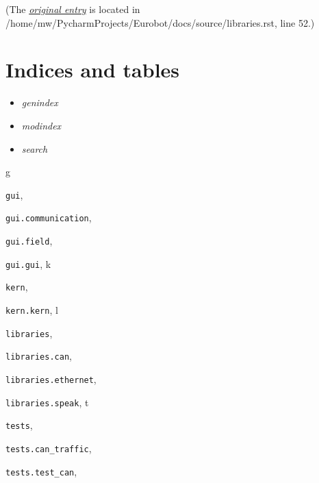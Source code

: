 \documentclass[letterpaper,10pt,english]{sphinxmanual}
\begin{document}
(The {\hyperref[libraries:index-0]{\emph{original entry}}} is located in  /home/mw/PycharmProjects/Eurobot/docs/source/libraries.rst, line 52.)


\chapter{Indices and tables}
\label{index:indices-and-tables}\begin{itemize}
\item {} 
\emph{genindex}

\item {} 
\emph{modindex}

\item {} 
\emph{search}

\end{itemize}


\renewcommand{\indexname}{Python Module Index}
\begin{theindex}
\def\bigletter#1{{\Large\sffamily#1}\nopagebreak\vspace{1mm}}
\bigletter{g}
\item {\texttt{gui}}, \pageref{gui:module-gui}
\item {\texttt{gui.communication}}, \pageref{gui:module-gui.communication}
\item {\texttt{gui.field}}, \pageref{gui:module-gui.field}
\item {\texttt{gui.gui}}, \pageref{gui:module-gui.gui}
\indexspace
\bigletter{k}
\item {\texttt{kern}}, \pageref{kern:module-kern}
\item {\texttt{kern.kern}}, \pageref{kern:module-kern.kern}
\indexspace
\bigletter{l}
\item {\texttt{libraries}}, \pageref{libraries:module-libraries}
\item {\texttt{libraries.can}}, \pageref{libraries:module-libraries.can}
\item {\texttt{libraries.ethernet}}, \pageref{libraries:module-libraries.ethernet}
\item {\texttt{libraries.speak}}, \pageref{libraries:module-libraries.speak}
\indexspace
\bigletter{t}
\item {\texttt{tests}}, \pageref{tests:module-tests}
\item {\texttt{tests.can\_traffic}}, \pageref{tests:module-tests.can_traffic}
\item {\texttt{tests.test\_can}}, \pageref{tests:module-tests.test_can}
\end{theindex}

\renewcommand{\indexname}{Index}
\printindex
\end{document}
